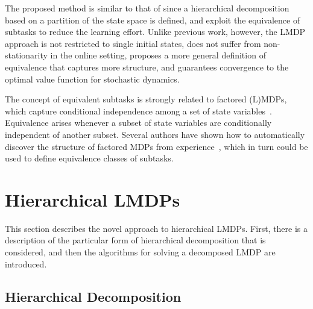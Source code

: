 
The proposed method is similar to that of \citet{Wen2020} since a hierarchical decomposition based on a partition of the state space is defined, and exploit the equivalence of subtasks to reduce the learning effort. Unlike previous work, however, the LMDP approach is not restricted to single initial states, does not suffer from non-stationarity in the online setting, proposes a more general definition of equivalence that captures more structure, and guarantees convergence to the optimal value function for stochastic dynamics.

The concept of equivalent subtasks is strongly related to factored (L)MDPs, which capture conditional independence among a set of state variables~\citep{Boutilier1995, Koller2000}. Equivalence arises whenever a subset of state variables are conditionally independent of another subset. Several authors have shown how to automatically discover the structure of factored MDPs from experience~\citep{Strehl2007,Kolobov2012}, which in turn could be used to define equivalence classes of subtasks.


\section{Hierarchical LMDPs}

This section describes the novel approach to hierarchical LMDPs. First, there is a description of the particular form of hierarchical decomposition that is considered, and then the algorithms for solving a decomposed LMDP are introduced.

\subsection{Hierarchical Decomposition}

